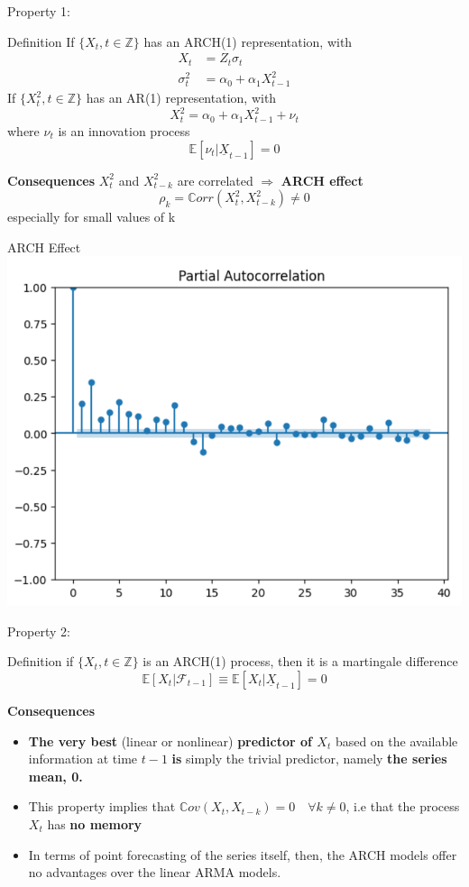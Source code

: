 \documentclass{beamer}
\def\Z{\mathbb{Z}}
\def\Esp{\mathbb{E}}
\def\Cov{\mathbb{C}ov}
\def\Corr{\mathbb{C}orr}
\def\F{\mathcal{F}}
\newcommand{\imfbold}[1]{\textbf{\textcolor{imfblue}{#1}}}
\begin{document}
\begin{frame}{Property 1:}
\begin{block}{Definition}
    If $\{ X_t, t\in\Z\}$ has an ARCH(1) representation, with
    \begin{align*}
        X_t & = Z_t\sigma_t\\
        \sigma_t^2 &= \alpha_0 +\alpha_1X_{t-1}^2
    \end{align*}
If $\{ X_t^2, t\in\Z\}$ has an AR(1) representation, with
$$X_t^2 = \alpha_0 +\alpha_1X_{t-1}^2 + \nu_t$$
where $\nu_t$ is an innovation process 
$$\Esp[\nu_t|\underline{X}_{t-1}] =0$$
\end{block}    
\imfbold{Consequences}
$X_t^2$ and $X_{t-k}^2$ are correlated $\Rightarrow$ \textbf{\color{red} ARCH effect}
$$\rho_k = \Corr(X_t^2, X_{t-k}^2) \neq 0$$
especially for small values of k
\end{frame}

\begin{frame}{ARCH Effect}
\centering
    \includegraphics[width=.8\textwidth]{static/course_3_img/PACF_squared_ret.png}
\end{frame}

\begin{frame}{Property 2:}
    \begin{block}{Definition}
        if $\{ X_t, t\in \Z\}$ is an ARCH(1) process, then it is a martingale difference
        $$\Esp[X_t|\F_{t-1}] \equiv \Esp[X_t|\underline{X}_{t-1}] =0 $$
    \end{block}
    \imfbold{Consequences}
    \begin{itemize}
        \item \textbf{The very best} (linear or nonlinear) \textbf{predictor of $X_t$} based on the available information at time $t-1$  \textbf{is} simply the trivial predictor, namely \textbf{the series mean, 0.}
        \item This property implies that $\Cov(X_t,X_{t-k}) =0\quad \forall k \neq 0$, i.e that the process $X_t$ has \textbf{no memory}
        \item In terms of point forecasting of the series itself, then, the ARCH models offer no advantages over the linear ARMA models.
    \end{itemize}
\end{frame}
\end{document}
